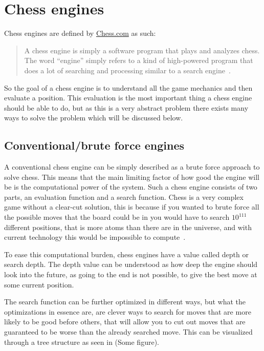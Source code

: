 \section{Chess engines}\label{sec:chess-engines}

Chess engines are defined by \url{Chess.com} as such:

\begin{quote}
    A chess engine is simply a software program that plays and analyzes chess.
    The word “engine” simply refers to a kind of high-powered program that does a
    lot of searching and processing similar to a search engine~\cite{chess-com-chess-engines}.
\end{quote}

So the goal of a chess engine is to understand all the game mechanics and then evaluate a position.
This evaluation is the most important thing a chess engine should be able to do, but as this is a very abstract
problem there exists many ways to solve the problem which will be discussed below.



\subsection{Conventional/brute force engines}\label{subsec:conventional-engines}

A conventional chess engine can be simply described as a brute force approach to solve chess.
This means that the main limiting factor of how good the engine will be is the computational power of the system.
Such a chess engine consists of two parts, an evaluation function and a search function.
Chess is a very complex game without a clear-cut solution, this is because if you wanted to brute force all the possible
moves that the board could be in you would have to search \( 10^{111} \) different positions, that is more atoms than
there are in the universe, and with current technology this would be impossible to compute~\cite{atoms}.

To ease this computational burden, chess engines have a value called depth or search depth.
The depth value can be understood as how deep the engine should look into the future, as going to the end is not
possible, to give the best move at some current position.

The search function can be further optimized in different ways, but what the optimizations in essence are, are
clever ways to search for moves that are more likely to be good before others, that will allow you to cut out moves that
are guaranteed to be worse than the already searched move.
This can be visualized through a tree structure as seen in (Some figure).

